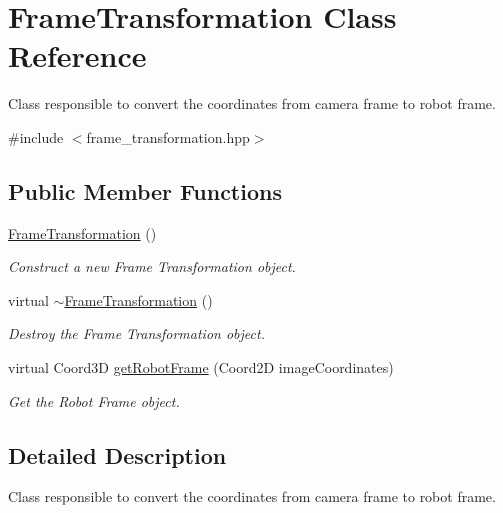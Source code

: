 \hypertarget{classFrameTransformation}{}\section{Frame\+Transformation Class Reference}
\label{classFrameTransformation}


Class responsible to convert the coordinates from camera frame to robot frame.  




{\ttfamily \#include $<$frame\+\_\+transformation.\+hpp$>$}

\subsection*{Public Member Functions}
\begin{DoxyCompactItemize}
\item 
\mbox{\label{classFrameTransformation_aa4495bbd8e06ac1d793063c7a0aa0c03}} 
\hyperlink{classFrameTransformation_aa4495bbd8e06ac1d793063c7a0aa0c03}{Frame\+Transformation} ()
\begin{DoxyCompactList}\small\item\em Construct a new Frame Transformation object. \end{DoxyCompactList}\item 
\mbox{\label{classFrameTransformation_a6db4d1bb1d72c02855aa2732205cd313}} 
virtual \hyperlink{classFrameTransformation_a6db4d1bb1d72c02855aa2732205cd313}{$\sim$\+Frame\+Transformation} ()
\begin{DoxyCompactList}\small\item\em Destroy the Frame Transformation object. \end{DoxyCompactList}\item 
virtual Coord3D \hyperlink{classFrameTransformation_ab5131e1392b2fb97c65014eec96d54a8}{get\+Robot\+Frame} (Coord2D image\+Coordinates)
\begin{DoxyCompactList}\small\item\em Get the Robot Frame object. \end{DoxyCompactList}\end{DoxyCompactItemize}


\subsection{Detailed Description}
Class responsible to convert the coordinates from camera frame to robot frame. 

